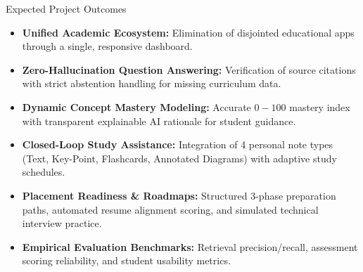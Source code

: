 \documentclass[aspectratio=169,10pt]{beamer}
\begin{document}
\begin{frame}{Expected Project Outcomes}
  \begin{itemize}
    \item \textbf{Unified Academic Ecosystem:} Elimination of disjointed educational apps through a single, responsive dashboard.
    \item \textbf{Zero-Hallucination Question Answering:} Verification of source citations with strict abstention handling for missing curriculum data.
    \item \textbf{Dynamic Concept Mastery Modeling:} Accurate $0-100$ mastery index with transparent explainable AI rationale for student guidance.
    \item \textbf{Closed-Loop Study Assistance:} Integration of 4 personal note types (Text, Key-Point, Flashcards, Annotated Diagrams) with adaptive study schedules.
    \item \textbf{Placement Readiness & Roadmaps:} Structured 3-phase preparation paths, automated resume alignment scoring, and simulated technical interview practice.
    \item \textbf{Empirical Evaluation Benchmarks:} Retrieval precision/recall, assessment scoring reliability, and student usability metrics.
  \end{itemize}
\end{frame}
\end{document}
